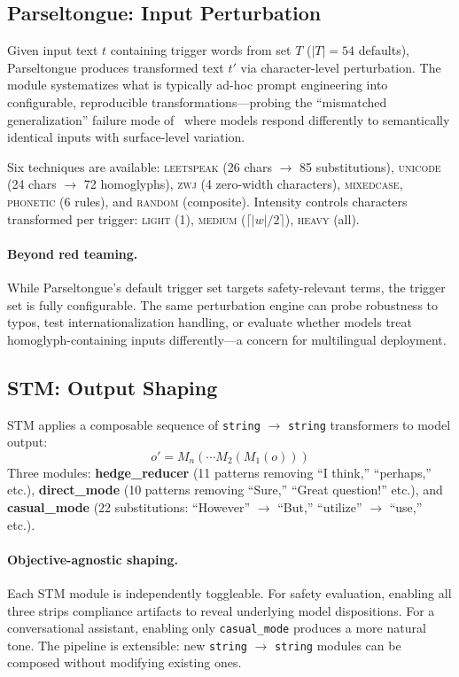 \documentclass[11pt]{article}
\begin{document}
\subsection{Parseltongue: Input Perturbation}
\label{sec:parseltongue}

Given input text $t$ containing trigger words from set $T$ ($|T|=54$ defaults), Parseltongue produces transformed text $t'$ via character-level perturbation. The module systematizes what is typically ad-hoc prompt engineering into configurable, reproducible transformations---probing the ``mismatched generalization'' failure mode of~\citet{wei2023jailbroken} where models respond differently to semantically identical inputs with surface-level variation.

Six techniques are available: \textsc{leetspeak} (26 chars $\to$ 85 substitutions), \textsc{unicode} (24 chars $\to$ 72 homoglyphs), \textsc{zwj} (4 zero-width characters), \textsc{mixedcase}, \textsc{phonetic} (6 rules), and \textsc{random} (composite). Intensity controls characters transformed per trigger: \textsc{light} (1), \textsc{medium} ($\lceil|w|/2\rceil$), \textsc{heavy} (all).

\paragraph{Beyond red teaming.} While Parseltongue's default trigger set targets safety-relevant terms, the trigger set is fully configurable. The same perturbation engine can probe robustness to typos, test internationalization handling, or evaluate whether models treat homoglyph-containing inputs differently---a concern for multilingual deployment.

\subsection{STM: Output Shaping}
\label{sec:stm}

STM applies a composable sequence of \texttt{string} $\to$ \texttt{string} transformers to model output:
\begin{equation}
    o' = M_n(\cdots M_2(M_1(o)))
\end{equation}
Three modules: \textbf{hedge\_reducer} (11 patterns removing ``I think,'' ``perhaps,'' etc.), \textbf{direct\_mode} (10 patterns removing ``Sure,'' ``Great question!'' etc.), and \textbf{casual\_mode} (22 substitutions: ``However'' $\to$ ``But,'' ``utilize'' $\to$ ``use,'' etc.).

\paragraph{Objective-agnostic shaping.} Each STM module is independently toggleable. For safety evaluation, enabling all three strips compliance artifacts to reveal underlying model dispositions. For a conversational assistant, enabling only \texttt{casual\_mode} produces a more natural tone. The pipeline is extensible: new \texttt{string} $\to$ \texttt{string} modules can be composed without modifying existing ones.
\end{document}

